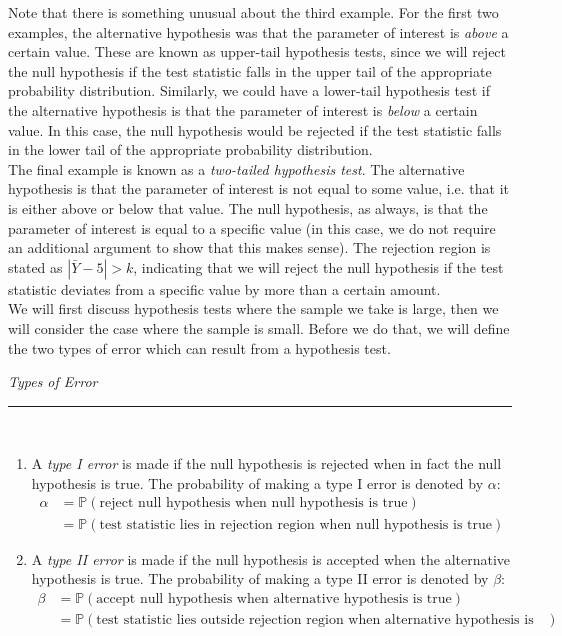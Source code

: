 \documentclass[12pt]{article}
\theoremstyle{definition}
\theoremstyle{remark}
\begin{document}
Note that there is something unusual about the third example. For the first two examples, the alternative hypothesis was that the parameter of interest is \emph{above} a certain value. These are known as upper-tail hypothesis tests, since we will reject the null hypothesis if the test statistic falls in the upper tail of the appropriate probability distribution. Similarly, we could have a lower-tail hypothesis test if the alternative hypothesis is that the parameter of interest is \emph{below} a certain value. In this case, the null hypothesis would be rejected if the test statistic falls in the lower tail of the appropriate probability distribution.\\

The final example is known as a \emph{two-tailed hypothesis test}. The alternative hypothesis is that the parameter of interest is not equal to some value, i.e. that it is either above or below that value. The null hypothesis, as always, is that the parameter of interest is equal to a specific value (in this case, we do not require an additional argument to show that this makes sense).
The rejection region is stated as $|\bar{Y} - 5| > k$, indicating that we will reject the null hypothesis if the test statistic deviates from a specific value by more than a certain amount.\\

We will first discuss hypothesis tests where the sample we take is large, then we will consider the case where the sample is small. Before we do that, we will define the two types of error which can result from a hypothesis test.

\begin{framed}
\emph{Types of Error}\\
  \rule{\dimexpr{}\fboxrule}{.1pt} \\
\begin{enumerate}
\item A \emph{type I error} is made if the null hypothesis is rejected when in fact the null hypothesis is true. The probability of making a type I error is denoted by $\alpha$:
\begin{align*}
\alpha &= \mathbb{P}(\mbox{reject null hypothesis when null hypothesis is true})\\
&= \mathbb{P}(\mbox{test statistic lies in rejection region  when null hypothesis is true})
\end{align*}

\item A \emph{type II error} is made if the null hypothesis is accepted when the alternative hypothesis is true. The probability of making a type II error is denoted by $\beta$:
\begin{align*}
\beta &= \mathbb{P}(\mbox{accept null hypothesis when alternative hypothesis is true})\\
&= \mathbb{P}(\mbox{test statistic lies outside rejection region when alternative hypothesis is true})
\end{align*}
\end{enumerate}
\end{framed}
 
\end{document}
